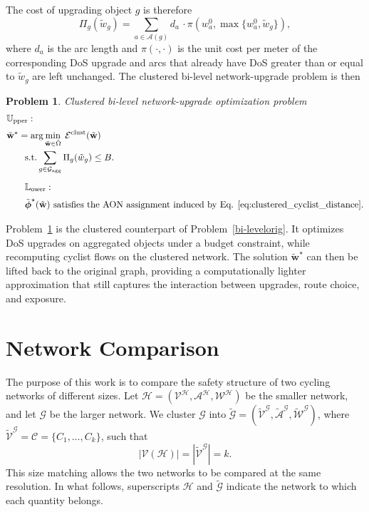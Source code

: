 \documentclass[lettersize,journal]{IEEEtran}
\newtheorem{problem}{Problem}
\begin{document}
The cost of upgrading object $g$ is therefore
\begin{equation}
\label{eq:cluster_upgrade_cost_exact}
\Pi_g(\tilde{w}_g)
=
\sum_{a\in\mathcal{A}(g)}
d_a\, \cdot
\pi
\left(
w_a^0,
\max\{w_a^0,\tilde{w}_g\}
\right),
\end{equation}
where $d_a$ is the arc length and $\pi(\cdot,\cdot)$ is the unit cost per meter
of the corresponding DoS upgrade and arcs that already have DoS greater than or equal to $\tilde{w}_g$ are left unchanged. The clustered bi-level network-upgrade problem is then
\begin{problem}{Clustered bi-level network-upgrade optimization problem}
\label{bi-levelcluster}
\begin{align}
& \mathbb{U}_{\mathrm{pper}}: \nonumber \\[0.2em]
& \tilde{\mathbf{w}}^{\star}
=
\arg\min_{\tilde{\mathbf{w}}\in\tilde{\Omega}}
\;
\mathcal{E}^{\mathrm{clust}}(\tilde{\mathbf{w}})
\label{eq:cluster_bi-level_upper_conf}
\\
& \quad \quad \mathrm{s.t. }
\sum_{g\in\mathcal{G}_{\mathrm{agg}}}
\Pi_g(\tilde{w}_g)
\leq B.
\label{eq:cluster_bi-level_budget_conf}
\\[0.5em]
& \quad \quad \mathbb{L}_{\mathrm{ower}}: \nonumber \\[0.2em]
& \quad \quad
\tilde{\boldsymbol{\phi}}^{\star}(\tilde{\mathbf{w}})
\text{ satisfies the AON assignment induced by Eq. \eqref{eq:clustered_cyclist_distance}}.
\nonumber
\end{align}
\end{problem}

Problem~\ref{bi-levelcluster} is the clustered counterpart of
Problem~\ref{bi-levelorig}. It optimizes DoS upgrades on aggregated objects
under a budget constraint, while recomputing cyclist flows on the clustered
network. The solution $\tilde{\mathbf{w}}^{\star}$ can then be lifted back to
the original graph, providing a computationally lighter approximation that still
captures the interaction between upgrades, route choice, and exposure.


\section{Network Comparison}
\label{sec:gw_comparison}



The purpose of this work is to compare the safety structure of two cycling networks
of different sizes. Let $\mathcal{H}=(\mathcal{V}^\mathcal{H},\mathcal{A}^\mathcal{H},\mathcal{W}^\mathcal{H})$
be the smaller network, and let $\mathcal{G}$ be the larger network. We cluster
$\mathcal{G}$ into
$\tilde{\mathcal{G}}=(\tilde{\mathcal{V}}^{\mathcal{G}},\tilde{\mathcal{A}}^{\mathcal{G}},\tilde{\mathcal{W}}^{\mathcal{G}})$,
where $\tilde{\mathcal{V}}^{\mathcal{G}}=\mathcal{C}=\{C_1,\dots,C_k\}$, such that
\[
    |\mathcal{V}(\mathcal{H})|
    =
    |\tilde{\mathcal{V}}^{\mathcal{G}}|
    =
    k .
\]
This size matching allows the two networks to be compared at the same resolution.
In what follows, superscripts $\mathcal{H}$ and $\tilde{\mathcal{G}}$ indicate the
network to which each quantity belongs.
\end{document}
